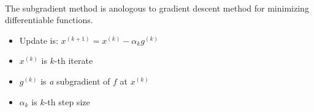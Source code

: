 \\
The subgradient method is anologous to gradient descent method for
minimizing differentiable functions.

\begin{itemize}
\item Update is: $x^{(k+1)}=x^{(k)}-\alpha_kg^{(k)}$
\item $x^{(k)}$ is $k$-th iterate
\item $g^{(k)}$ is \emph{a} subgradient of $f$ at $x^{(k)}$
\item $\alpha_k$ is $k$-th step size

\end{itemize}
